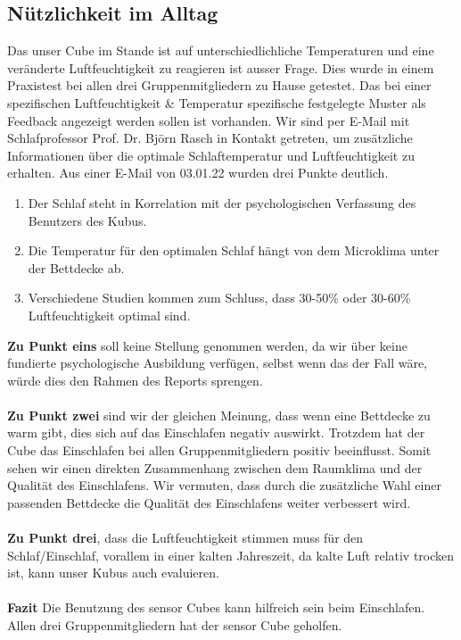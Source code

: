 \documentclass{article}
\begin{document}
\subsection{Nützlichkeit im Alltag}
Das unser Cube im Stande ist auf unterschiedlichliche Temperaturen und eine veränderte Luftfeuchtigkeit zu reagieren ist ausser Frage. Dies wurde in einem Praxistest bei allen drei Gruppenmitgliedern zu Hause getestet. Das bei einer spezifischen Luftfeuchtigkeit \& Temperatur spezifische festgelegte Muster als Feedback angezeigt werden sollen ist vorhanden. \newline Wir sind per E-Mail mit Schlafprofessor Prof. Dr. Björn Rasch in Kontakt getreten, um zusätzliche Informationen über die optimale Schlaftemperatur und Luftfeuchtigkeit zu erhalten. Aus einer E-Mail von 03.01.22 wurden drei Punkte deutlich. 
\begin{enumerate}
\item Der Schlaf steht in Korrelation mit der psychologischen Verfassung des Benutzers des Kubus.
\item Die Temperatur für den optimalen Schlaf hängt von dem Microklima unter der Bettdecke ab.
\item Verschiedene Studien kommen zum Schluss, dass 30-50\% oder 30-60\% Luftfeuchtigkeit optimal sind.    
\end{enumerate}
\textbf{Zu Punkt eins} soll keine Stellung genommen werden, da wir über keine fundierte psychologische Ausbildung verfügen, selbst wenn das der Fall wäre, würde dies den Rahmen des Reports sprengen. \\ \\ \textbf{Zu Punkt zwei} sind wir der gleichen Meinung, dass wenn eine Bettdecke zu warm gibt, dies sich auf das Einschlafen negativ auswirkt. Trotzdem hat der Cube das Einschlafen bei allen Gruppenmitgliedern positiv beeinflusst. Somit sehen wir einen direkten Zusammenhang zwischen dem Raumklima und der Qualität des Einschlafens. Wir vermuten, dass durch die zusätzliche Wahl einer passenden Bettdecke die Qualität des Einschlafens weiter verbessert wird. \\ \\ \textbf{Zu Punkt drei}, dass die Luftfeuchtigkeit stimmen muss für den Schlaf/Einschlaf, vorallem in einer kalten Jahreszeit, da kalte Luft relativ trocken ist, kann unser Kubus auch evaluieren. \\ \\
\textbf{Fazit} Die Benutzung des sensor Cubes kann hilfreich sein beim Einschlafen. Allen drei Gruppenmitgliedern hat der sensor Cube geholfen. 
 
\end{document}
